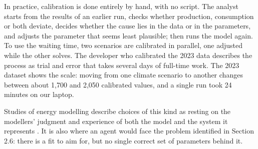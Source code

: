 In practice, calibration is done entirely by hand, with no script.
The analyst starts from the results of an earlier run, checks whether production, consumption or both deviate, decides whether the cause lies in the data or in the parameters, and adjusts the parameter that seems least plausible; then runs the model again.
To use the waiting time, two scenarios are calibrated in parallel, one adjusted while the other solves.
The developer who calibrated the 2023 data describes the process as trial and error that takes several days of full-time work.
The 2023 dataset shows the scale: moving from one climate scenario to another changes between about 1,700 and 2,050 calibrated values, and a single run took 24 minutes on our laptop.

Studies of energy modelling describe choices of this kind as resting on the modellers' judgment and experience of both the model and the system it represents \citep{silvast2020energy}.
It is also where an agent would face the problem identified in Section 2.6: there is a fit to aim for, but no single correct set of parameters behind it.
